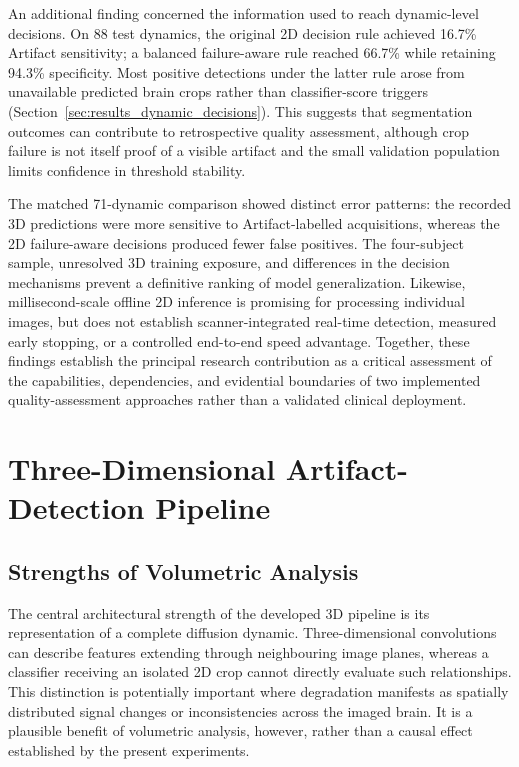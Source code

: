 An additional finding concerned the information used to reach dynamic-level decisions. On 88 test dynamics, the original 2D decision rule achieved 16.7\% Artifact sensitivity; a balanced failure-aware rule reached 66.7\% while retaining 94.3\% specificity. Most positive detections under the latter rule arose from unavailable predicted brain crops rather than classifier-score triggers (Section~\ref{sec:results_dynamic_decisions}). This suggests that segmentation outcomes can contribute to retrospective quality assessment, although crop failure is not itself proof of a visible artifact and the small validation population limits confidence in threshold stability.

The matched 71-dynamic comparison showed distinct error patterns: the recorded 3D predictions were more sensitive to Artifact-labelled acquisitions, whereas the 2D failure-aware decisions produced fewer false positives. The four-subject sample, unresolved 3D training exposure, and differences in the decision mechanisms prevent a definitive ranking of model generalization. Likewise, millisecond-scale offline 2D inference is promising for processing individual images, but does not establish scanner-integrated real-time detection, measured early stopping, or a controlled end-to-end speed advantage. Together, these findings establish the principal research contribution as a critical assessment of the capabilities, dependencies, and evidential boundaries of two implemented quality-assessment approaches rather than a validated clinical deployment.

\section{Three-Dimensional Artifact-Detection Pipeline}
\label{sec:discussion_3d}

\subsection{Strengths of Volumetric Analysis}
\label{subsec:discussion_3d_strengths}

The central architectural strength of the developed 3D pipeline is its representation of a complete diffusion dynamic. Three-dimensional convolutions can describe features extending through neighbouring image planes, whereas a classifier receiving an isolated 2D crop cannot directly evaluate such relationships. This distinction is potentially important where degradation manifests as spatially distributed signal changes or inconsistencies across the imaged brain. It is a plausible benefit of volumetric analysis, however, rather than a causal effect established by the present experiments.

